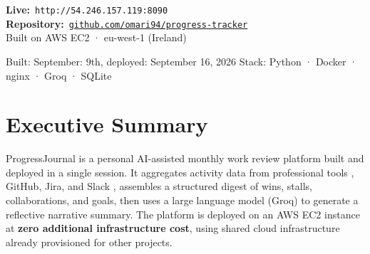 \documentclass[12pt,a4paper]{article}
\begin{document}
\begin{center}
\vspace{0.9cm}


\vspace{1.1cm}

\begin{tcolorbox}[callout, width=11cm, center]
  \centering
  \textbf{Live:}~\texttt{\color{accent}http://54.246.157.119:8090}\\[3pt]
  \textbf{Repository:}~\href{https://github.com/omari94/progress-tracker}%
    {\texttt{\small github.com/omari94/progress-tracker}}\\[3pt]
  \textcolor{inkfaint}{\small Built on AWS EC2 · eu-west-1 (Ireland)}
\end{tcolorbox}

\vfill
\textcolor{inkfaint}{\footnotesize Built: September: 9th, deployed: September 16, 2026
\quad\textbullet\quad
Stack: Python · Docker · nginx · Groq · SQLite}

\end{center}

\newpage
\setcounter{page}{1}

\section{Executive Summary}

ProgressJournal is a personal AI-assisted monthly work review platform built and deployed in a single session. It aggregates activity data from professional tools , GitHub, Jira, and Slack , assembles a structured digest of wins, stalls, collaborations, and goals, then uses a large language model (Groq) to generate a reflective narrative summary. The platform is deployed on an AWS EC2 instance at \textbf{zero additional infrastructure cost}, using shared cloud infrastructure already provisioned for other projects.
\end{document}
